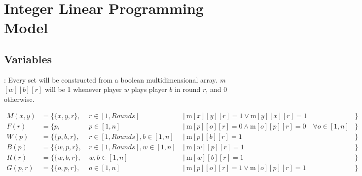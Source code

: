 \documentclass[9pt, aspectratio=169, xcolor=table]{beamer}
\begin{document}
\section{Integer Linear Programming Model}
\subsection{Variables}
\begin{frame}{\secname: \subsecname}
    Every set will be constructed from a boolean multidimensional array. \textit{m}$[w][b][r]$ will be 1 whenever player $w$ plays player $b$ in round $r$, and 0 otherwise.
    \begin{tcolorbox}[colback=gray!30, colframe=Veronablue, arc=0pt, outer arc=0pt, title = \textbf{Set constructions}]
	\begin{align*}
	    M(x, y)   &= \{\{x, y, r\}, &\ r \in [1, Rounds]              \ &| \ \text{m}[x][y][r] = 1 \lor \text{m}[y][x][r] = 1                         &\}\\
	    F(r)      &= \{p          , &\ p \in [1, n]                   \ &| \ \text{m}[p][o][r] = 0 \land \text{m}[o][p][r] = 0  \quad \forall o \in [1, n]&\}\\
	    W(p)      &= \{\{p, b, r\}, &\ r \in [1, Rounds], b \in [1, n]\ &| \ \text{m}[p][b][r] = 1                                                    &\}\\
	    B(p)      &= \{\{w, p, r\}, &\ r \in [1, Rounds], w \in [1, n]\ &| \ \text{m}[w][p][r] = 1                                                    &\}\\
	    R(r)      &= \{\{w, b, r\}, &\ w, b \in [1, n]                \ &| \ \text{m}[w][b][r] = 1                                                    &\}\\
	    G(p, r)   &= \{\{o, p, r\}, &\ o \in [1, n]                   \ &| \ \text{m}[p][o][r] = 1  \lor \text{m}[o][p][r] = 1                        &\}\\
	\end{align*}
    \end{tcolorbox}
\end{frame}
\end{document}
